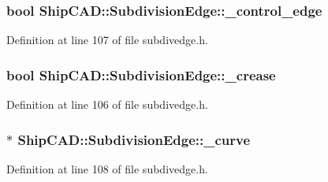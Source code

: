 \subsubsection[{\texorpdfstring{\+\_\+control\+\_\+edge}{_control_edge}}]{\setlength{\rightskip}{0pt plus 5cm}bool Ship\+C\+A\+D\+::\+Subdivision\+Edge\+::\+\_\+control\+\_\+edge\hspace{0.3cm}{\ttfamily [protected]}}\hypertarget{classShipCAD_1_1SubdivisionEdge_ae933ee4901a7964ca50a83edad44e8ec}{}\label{classShipCAD_1_1SubdivisionEdge_ae933ee4901a7964ca50a83edad44e8ec}


Definition at line 107 of file subdivedge.\+h.

\subsubsection[{\texorpdfstring{\+\_\+crease}{_crease}}]{\setlength{\rightskip}{0pt plus 5cm}bool Ship\+C\+A\+D\+::\+Subdivision\+Edge\+::\+\_\+crease\hspace{0.3cm}{\ttfamily [protected]}}\hypertarget{classShipCAD_1_1SubdivisionEdge_a9ea4714611e4970cf5e4014304a20190}{}\label{classShipCAD_1_1SubdivisionEdge_a9ea4714611e4970cf5e4014304a20190}


Definition at line 106 of file subdivedge.\+h.

\subsubsection[{\texorpdfstring{\+\_\+curve}{_curve}}]{$\ast$ Ship\+C\+A\+D\+::\+Subdivision\+Edge\+::\+\_\+curve\hspace{0.3cm}{\ttfamily [protected]}}\hypertarget{classShipCAD_1_1SubdivisionEdge_a1863a7ef84b2d73f0e1407f3536bbc9f}{}\label{classShipCAD_1_1SubdivisionEdge_a1863a7ef84b2d73f0e1407f3536bbc9f}


Definition at line 108 of file subdivedge.\+h.

